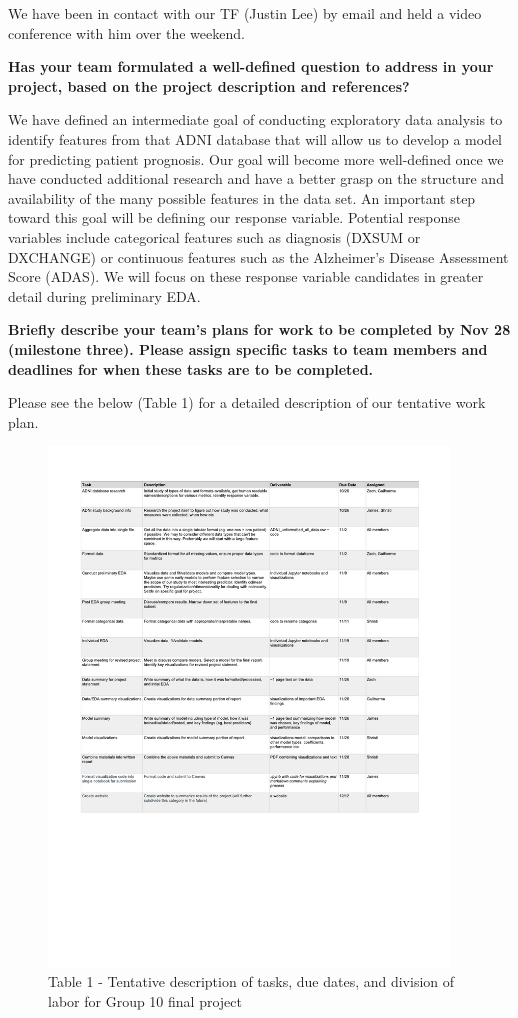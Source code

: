 \documentclass[11pt]{article}
\begin{document}
We have been in contact with our TF (Justin Lee) by email and held a video conference with him over the weekend.
\vspace*{0.3cm}

\textbf{Has your team formulated a well-defined question to address in your project, based on the project description and references?}

We have defined an intermediate goal of conducting exploratory data analysis to identify features from that ADNI database that will allow us to develop a model for predicting patient prognosis. Our goal will become more well-defined once we have conducted additional research and have a better grasp on the structure and availability of the many possible features in the data set. An important step toward this goal will be defining our response variable. Potential response variables include categorical features such as diagnosis (DXSUM or DXCHANGE) or continuous features such as the Alzheimer's Disease Assessment Score (ADAS). We will focus on these response variable candidates in greater detail during preliminary EDA.
\vspace*{0.3cm}

\textbf{Briefly describe your team’s plans for work to be completed by Nov 28 (milestone three). Please assign specific tasks to team members and deadlines for when these tasks are to be completed.}

Please see the below (Table 1) for a detailed description of our tentative work plan.

\begin{center}
\begin{figure}[t!]
	\includegraphics[width=0.95\textwidth]{schedule.pdf}
	\vspace*{-6.5cm}
	\caption*{\footnotesize Table 1 - Tentative description of tasks, due dates, and division of labor for Group 10 final project}
\end{figure}
\end{center}
\end{document}
